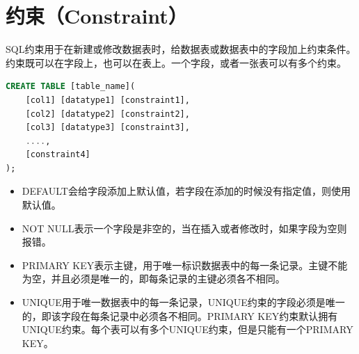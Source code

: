 \documentclass[12pt, openany, oneside]{book}
\begin{document}
\section{约束（Constraint）}

SQL约束用于在新建或修改数据表时，给数据表或数据表中的字段加上约束条件。约束既可以在字段上，也可以在表上。一个字段，或者一张表可以有多个约束。

\vspace{-0.5cm}

\begin{lstlisting}[language=SQL]
CREATE TABLE [table_name](
    [col1] [datatype1] [constraint1],
    [col2] [datatype2] [constraint2],
    [col3] [datatype3] [constraint3],
    ....,
    [constraint4]
);
\end{lstlisting}

\begin{table}[H]
    \centering
    \caption{约束}
\end{table}

\begin{itemize}
    \item DEFAULT会给字段添加上默认值，若字段在添加的时候没有指定值，则使用默认值。

    \item NOT NULL表示一个字段是非空的，当在插入或者修改时，如果字段为空则报错。

    \item PRIMARY KEY表示主键，用于唯一标识数据表中的每一条记录。主键不能为空，并且必须是唯一的，即每条记录的主键必须各不相同。

    \item UNIQUE用于唯一数据表中的每一条记录，UNIQUE约束的字段必须是唯一的，即该字段在每条记录中必须各不相同。PRIMARY KEY约束默认拥有UNIQUE约束。每个表可以有多个UNIQUE约束，但是只能有一个PRIMARY KEY。
\end{itemize}
\end{document}
